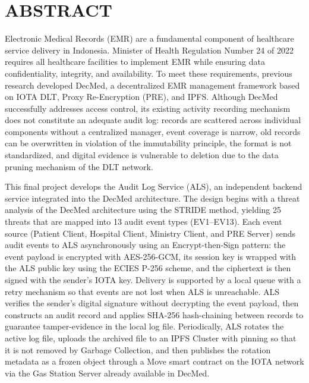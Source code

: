 \clearpage
\chapter*{ABSTRACT}

\begin{singlespace}
	\small
	Electronic Medical Records (EMR) are a fundamental component of healthcare service delivery in Indonesia. Minister of Health Regulation Number 24 of 2022 requires all healthcare facilities to implement EMR while ensuring data confidentiality, integrity, and availability. To meet these requirements, previous research developed DecMed, a decentralized EMR management framework based on IOTA DLT, Proxy Re-Encryption (PRE), and IPFS. Although DecMed successfully addresses access control, its existing activity recording mechanism does not constitute an adequate audit log: records are scattered across individual components without a centralized manager, event coverage is narrow, old records can be overwritten in violation of the immutability principle, the format is not standardized, and digital evidence is vulnerable to deletion due to the data pruning mechanism of the DLT network.

	This final project develops the Audit Log Service (ALS), an independent backend service integrated into the DecMed architecture. The design begins with a threat analysis of the DecMed architecture using the STRIDE method, yielding 25 threats that are mapped into 13 audit event types (EV1--EV13). Each event source (Patient Client, Hospital Client, Ministry Client, and PRE Server) sends audit events to ALS asynchronously using an Encrypt-then-Sign pattern: the event payload is encrypted with AES-256-GCM, its session key is wrapped with the ALS public key using the ECIES P-256 scheme, and the ciphertext is then signed with the sender's IOTA key. Delivery is supported by a local queue with a retry mechanism so that events are not lost when ALS is unreachable. ALS verifies the sender's digital signature without decrypting the event payload, then constructs an audit record and applies SHA-256 hash-chaining between records to guarantee tamper-evidence in the local log file. Periodically, ALS rotates the active log file, uploads the archived file to an IPFS Cluster with pinning so that it is not removed by Garbage Collection, and then publishes the rotation metadata as a frozen object through a Move smart contract on the IOTA network via the Gas Station Server already available in DecMed.


\end{singlespace}
